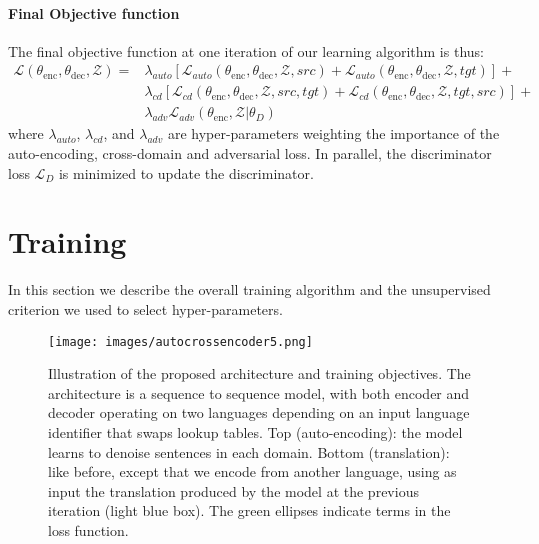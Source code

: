 \documentclass{article} \usepackage{iclr2018_conference,times}
\begin{document}
\paragraph{Final Objective function}
The final objective function at one iteration of our learning algorithm is thus:
\begin{equation}
\begin{aligned}
    \mathcal{L}(\theta_\mathrm{enc},\theta_\mathrm{dec},\mathcal{Z}) = &
        \lambda_{auto} [ \mathcal{L}_{auto}(\theta_\mathrm{enc},\theta_\mathrm{dec},\mathcal{Z},src) +  \mathcal{L}_{auto}(\theta_\mathrm{enc},\theta_\mathrm{dec},\mathcal{Z},tgt) ] +\\ 
        &\lambda_{cd} [\mathcal{L}_{cd}(\theta_\mathrm{enc},\theta_\mathrm{dec},\mathcal{Z},src,tgt) + \mathcal{L}_{cd}(\theta_\mathrm{enc},\theta_\mathrm{dec},\mathcal{Z},tgt,src)] +\\
        &\lambda_{adv} \mathcal{L}_{adv}(\theta_\mathrm{enc},\mathcal{Z} | \theta_D) \label{eq:loss}
        \end{aligned}
\end{equation}
where $\lambda_{auto}$, $\lambda_{cd}$, and $\lambda_{adv}$ are hyper-parameters weighting the importance of the auto-encoding, cross-domain and adversarial loss. In parallel, the discriminator loss $\mathcal{L}_D$ is minimized to update the discriminator.
  \section{Training}
In this section we describe the overall training algorithm and the unsupervised criterion we used to select hyper-parameters.

\begin{figure}[!t]
\begin{center}
\texttt{[image: images/autocrossencoder5.png]}
\end{center}
\caption{Illustration of the proposed architecture and training objectives. The architecture is a sequence to sequence model, with both encoder and decoder operating on two languages depending on an input language identifier that swaps lookup tables.
Top (auto-encoding): the model learns to denoise sentences in each domain. Bottom (translation): like before, except that we encode from another language, using as input the translation produced by the model at the previous iteration (light blue box). The green ellipses indicate terms in the loss function.}
\label{fig:model_outline1}
\end{figure}
\end{document}
